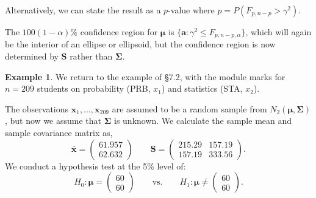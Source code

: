 \documentclass[]{book}
\theoremstyle{definition}
\theoremstyle{definition}
\newtheorem{example}{Example}[chapter]
\theoremstyle{definition}
\theoremstyle{remark}
\begin{document}
Alternatively, we can state the result as a \(p\)-value where \(p = P(F_{p,n-p} > \gamma^2)\).

The \(100(1-\alpha)\)\% confidence region for \(\boldsymbol \mu\) is \(\{ \boldsymbol a: \gamma^2 \leq F_{p,n-p,\alpha} \}\), which will again be the interior of an ellipse or ellipsoid, but the confidence region is now determined by \(\boldsymbol S\) rather than \(\boldsymbol \Sigma\).

\begin{example}
\protect\hypertarget{exm:unnamed-chunk-2}{}{\label{exm:unnamed-chunk-2} }We return to the example of \S 7.2, with the module marks for \(n=209\) students on probability (PRB, \(x_1\)) and statistics (STA, \(x_2\)).

The observations \(\boldsymbol x_1,\ldots,\boldsymbol x_{209}\) are assumed to be a random sample from \(N_2(\boldsymbol \mu,\boldsymbol \Sigma)\), but now we assume that \(\boldsymbol \Sigma\) is unknown. We calculate the sample mean and sample covariance matrix as,
\[\bar{\boldsymbol x} = \begin{pmatrix} 61.957 \\ 62.632 \end{pmatrix} \qquad \boldsymbol S= \begin{pmatrix} 215.29 & 157.19 \\ 157.19 & 333.56 \end{pmatrix}.\]
We conduct a hypothesis test at the 5\% level of:
\[H_0: \boldsymbol \mu= \begin{pmatrix} 60 \\ 60 \end{pmatrix} \qquad \text{vs.} \qquad H_1: \boldsymbol \mu\neq \begin{pmatrix} 60 \\ 60 \end{pmatrix}.\]


\end{example}
\end{document}
